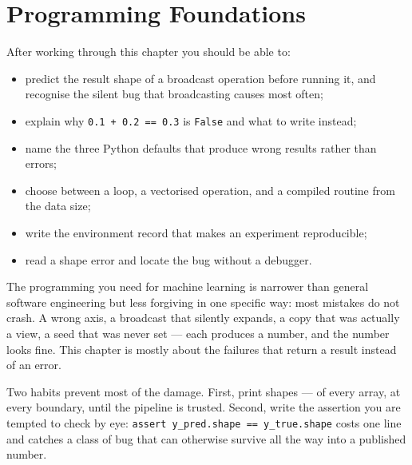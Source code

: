 
\chapter{Programming Foundations}

\label{ch:programming-foundations}

\begin{learningobjectives}
After working through this chapter you should be able to:
\begin{itemize}
  \item predict the result shape of a broadcast operation before running it,
        and recognise the silent bug that broadcasting causes most often;
  \item explain why \texttt{0.1 + 0.2 == 0.3} is \texttt{False} and what to
        write instead;
  \item name the three Python defaults that produce wrong results rather than
        errors;
  \item choose between a loop, a vectorised operation, and a compiled routine
        from the data size;
  \item write the environment record that makes an experiment reproducible;
  \item read a shape error and locate the bug without a debugger.
\end{itemize}
\end{learningobjectives}

\begin{plainlanguage}
The programming you need for machine learning is narrower than general software
engineering but less forgiving in one specific way: most mistakes do not crash.
A wrong axis, a broadcast that silently expands, a copy that was actually a
view, a seed that was never set --- each produces a number, and the number
looks fine. This chapter is mostly about the failures that return a result
instead of an error.
\end{plainlanguage}

\begin{engineernote}
Two habits prevent most of the damage. First, print shapes --- of every array,
at every boundary, until the pipeline is trusted. Second, write the assertion
you are tempted to check by eye: \texttt{assert y\_pred.shape == y\_true.shape}
costs one line and catches a class of bug that can otherwise survive all the
way into a published number.
\end{engineernote}


